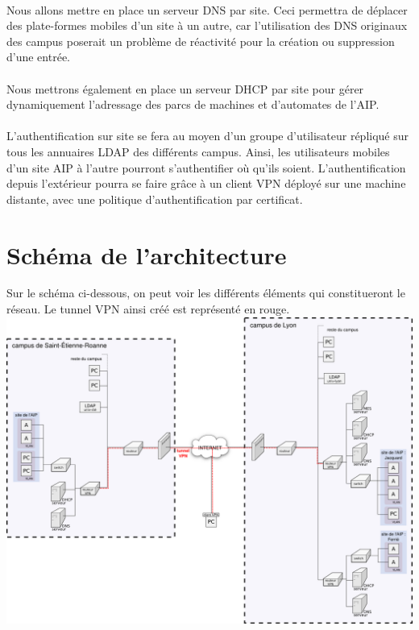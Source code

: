 \documentclass[a4paper]{article}
\begin{document}
	\paragraph*{} %
	Nous allons mettre en place un serveur DNS par site. Ceci permettra de déplacer des plate-formes mobiles d'un site à un autre, car l'utilisation des DNS originaux des campus poserait un problème de réactivité pour la création ou suppression d'une entrée. 
	
	\paragraph*{} %
	Nous mettrons également en place un serveur DHCP par site pour gérer dynamiquement l'adressage des parcs de machines et d'automates de l'AIP. 
	
	\paragraph*{} %
	L'authentification sur site se fera au moyen d'un groupe d'utilisateur répliqué sur tous les annuaires LDAP des différents campus. Ainsi, les utilisateurs mobiles d'un site AIP à l'autre pourront s'authentifier où qu'ils soient. L'authentification depuis l'extérieur pourra se faire grâce à un client VPN déployé sur une machine distante, avec une politique d'authentification par certificat. 
	
	
	\newpage
	
	
	\section{Schéma de l'architecture}
	Sur le schéma ci-dessous, on peut voir les différents éléments qui constitueront le réseau. Le tunnel VPN ainsi créé est représenté en rouge. \\
	\includegraphics[width=\linewidth]{schema_archi.png}
\end{document}
